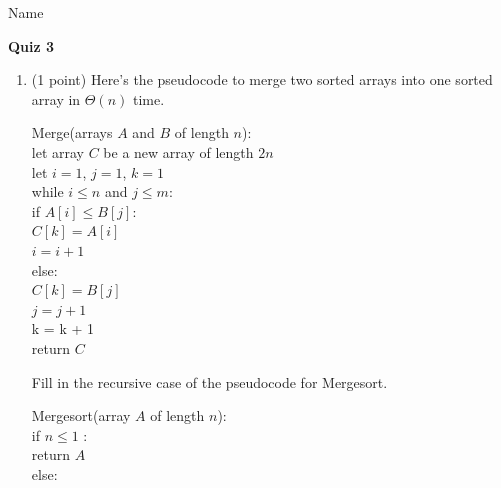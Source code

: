 \documentclass[11pt]{article}
\begin{document}
\noindent Name \underline{\hspace{12cm}}\\


\begin{center}
\LARGE\textbf{Quiz 3}%
\end{center}


\begin{enumerate}

    \item (1 point)
    Here's the pseudocode to merge two sorted arrays into one sorted array in $\Theta(n)$ time.
    \begin{algo}
    Merge(arrays $A$ and $B$ of length $n$):\+\\
    let array $C$ be a new array of length $2n$\\
    let $i = 1$, $j = 1$, $k = 1$\\
    while $i \leq n$ and $j \leq m$:\+\\
        if $A[i] \leq B[j]$:\+\\
            $C[k] = A[i]$\\
            $i = i + 1$\-\\
        else:\+\\
            $C[k] = B[j]$\\
            $j = j + 1$\-\\
        k = k + 1\-\\
    return $C$\-\\
    \end{algo}
    Fill in the recursive case of the pseudocode for Mergesort.

    \begin{algo}
    Mergesort(array $A$ of length $n$):\+\\
    if $n \leq 1$ \+:\\
        return $A$\-\\
    else:
    \\
    \\
    \\
    \\
    \\
    \\
    \\
    \\
    \\
    \\
    \\
    \\
    \hspace{5in}


\end{algo}
\end{enumerate}
\end{document}

